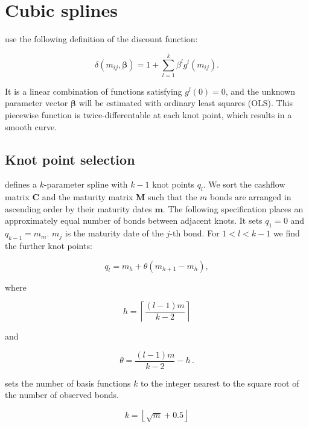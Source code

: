 \section{Cubic splines}
\label{sec:cubic-splines}

\cite{McCulloch1971, McCulloch1975} use the following definition of the discount function:

\begin{equation}
  \label{eq:df_spline}
  \delta(m_{ij},\bm{\beta})=1+\sum_{l=1}^k\beta^lg^l(m_{ij}).
\end{equation}

It is a linear combination of functions satisfying $g^l(0)=0$, and the unknown parameter vector $\bm{\beta}$ will be estimated with ordinary least squares (OLS). This piecewise function is twice-differentable at each knot point, which results in a smooth curve.

\subsection{Knot point selection}

\cite{McCulloch1975} defines a $k$-parameter spline with $k-1$ knot points $q_l$. We sort the cashflow matrix $\bm{C}$ and the maturity matrix $\bm{M}$ such that the $m$ bonds are arranged in ascending order by their maturity dates $\bm{m}$. The following specification places an approximately equal number of bonds between adjacent knots. It sets $q_1=0$ and $q_{k-1}=m_m$. $m_j$ is the maturity date of the $j$-th bond. For $1<l<k-1$ we find the further knot points:

\begin{equation*}
  \label{eq:A.1a}
  q_l = m_h+\theta(m_{h+1}-m_h),
\end{equation*}

where

\begin{equation*}
 \label{eq:A.1b}
  h = \left\lceil\frac{(l-1)m}{k-2}\right\rceil
\end{equation*}

and

\begin{equation*}
  \label{eq:A.1c}
  \theta = \frac{(l-1)m}{k-2}-h\,.
\end{equation*}

\cite{McCulloch1971} sets the  number of basis functions $k$ to the integer nearest to the square root of the number of observed bonds. 

\begin{equation*}
  \label{eq:nofknots}
  k = \left\lfloor\sqrt{m}+0.5\right\rfloor
\end{equation*}

